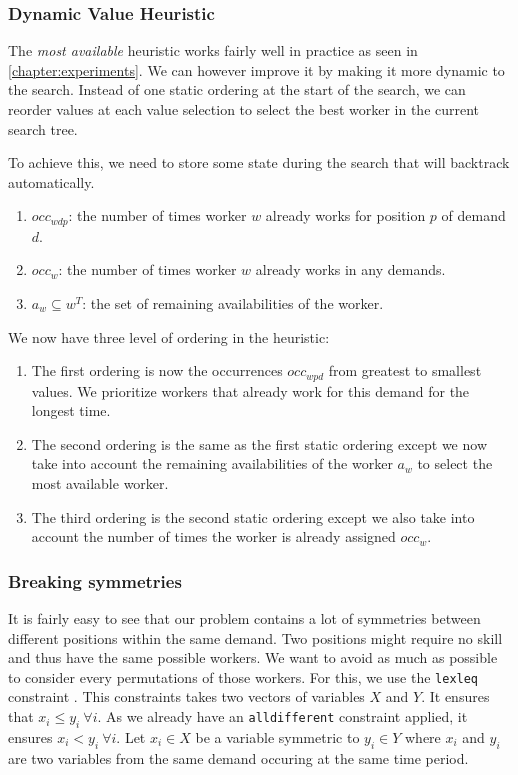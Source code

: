 \documentclass[../../thesis.tex]{subfiles}
\begin{document}
\subsubsection{Dynamic Value Heuristic}

The \emph{most available} heuristic works fairly well in practice as seen in \autoref{chapter:experiments}. 
We can however improve it by making it more dynamic to the search. Instead of one static ordering at the start of the search,
we can reorder values at each value selection to select the best worker in the current search tree.

To achieve this, we need to store some state during the search that will backtrack automatically.

\begin{enumerate}
  \item $occ_{wdp}$: the number of times worker $w$ already works for position $p$ of demand $d$.
  \item $occ_{w}$: the number of times worker $w$ already works in any demands.
  \item $a_{w} \subseteq w^T$: the set of remaining availabilities of the worker.
\end{enumerate}

We now have three level of ordering in the heuristic:

\begin{enumerate}
  \item The first ordering is now the occurrences $occ_{wpd}$ from greatest to smallest values. We prioritize workers that already work for this demand for the longest time.
  \item The second ordering is the same as the first static ordering except we now take into account the 
        remaining availabilities of the worker $a_w$ to select the most available worker.
  \item The third ordering is the second static ordering except we also take into account the number of times the worker 
        is already assigned $occ_w$.
\end{enumerate}


\subsubsection{Breaking symmetries}

It is fairly easy to see that our problem contains a lot of symmetries between different positions within the same demand. 
Two positions might require no skill and thus have the same possible workers. We want to avoid as much as possible to consider every permutations of those workers.
For this, we use the \texttt{lexleq} constraint \cite{Alan:Lex}. This constraints takes two vectors of variables $X$ and $Y$. It ensures that 
$x_i \leq y_i \ \forall i$. As we already have an \texttt{alldifferent} constraint applied, it ensures $x_i < y_i \ \forall i$.
Let $x_i \in X$ be a variable symmetric to $y_i \in Y$ where $x_i$ and $y_i$ are two variables from the same demand occuring at the same time period.
\end{document}
